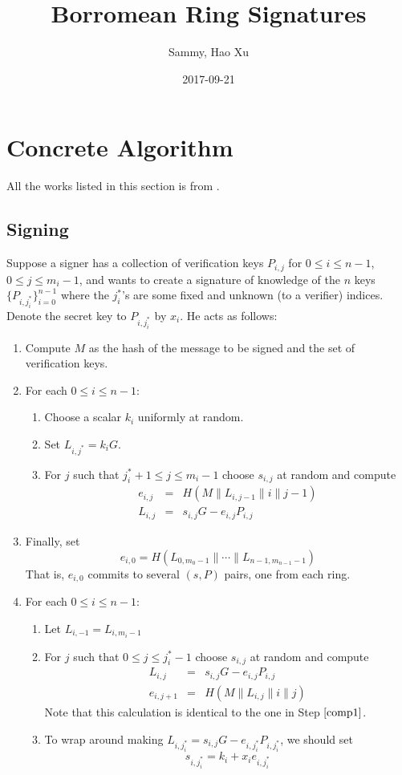 \documentclass[a4paper,10pt]{article}
\title{Borromean Ring Signatures}
\author{Sammy, Hao Xu}
\date{2017-09-21}
\begin{document}
\maketitle

\section{Concrete Algorithm}
All the works listed in this section is from \cite{borromean-ring-signatures}.
\subsection{Signing}
Suppose a signer has a collection of verification keys $P_{i,j}$ for $0\leq i\leq n-1$, $0\leq j\leq m_i-1$, and wants to create a signature of knowledge of the $n$ keys $\{P_{i,j^*_i}\}_{i=0}^{n-1}$ where the $j^*_i$'s are some fixed and unknown (to a verifier) indices. Denote the secret key to $P_{i,j^*_i}$ by $x_i$. He acts as follows: 
\begin{enumerate}
	\item Compute $M$ as the hash of the message to be signed and the set of verification keys.
	\item For each $0\leq i\leq n-1$:
		\begin{enumerate}
			\item Choose a scalar $k_i$ uniformly at random.
			\item Set $L_{i,j^*} = k_iG$.
			\item For $j$ such that $j^*_i+1\leq j\leq m_i - 1$ choose $s_{i,j}$ at random and compute\label{comp1}
				\begin{eqnarray}
					e_{i,j} &= &H(M\| L_{i,j-1} \| i \| j - 1)	\\
					L_{i,j} &= &s_{i,j}G - e_{i,j}P_{i,j}
				\end{eqnarray}
		\end{enumerate}
	\item Finally, set 
			\[ 
				e_{i,0} = H(L_{0,m_0-1} \| \cdots \| L_{n-1,m_{n-1}-1}) 
			\] 
			That is, $e_{i,0}$ commits to several $(s, P)$ pairs, one from each ring.
	\item For each $0\leq i\leq n-1$:
		\begin{enumerate}
			\item Let \(L_{i,-1}=L_{i,m_i-1}\)
			\item For $j$ such that $0\leq j\leq j^*_i - 1$ choose $s_{i,j}$ at random and compute 
				\begin{eqnarray}
					L_{i,j} &= &s_{i,j}G-e_{i,j}P_{i,j} \\
					e_{i,j+1} &= &H(M\| L_{i,j}\|i\|j) 
				\end{eqnarray}
				Note that this calculation is identical to the one in Step $\ref{comp1}$.
			\item To wrap around making \(L_{i,j_i^*}=s_{i,j}G-e_{i,j_i^*}P_{i,j_i^*}\), we should set
				\begin{equation}
					s_{i,j_i^*}=k_i+x_i e_{i,j_i^*}
				\end{equation}
		\end{enumerate}
\end{enumerate}
\end{document}
